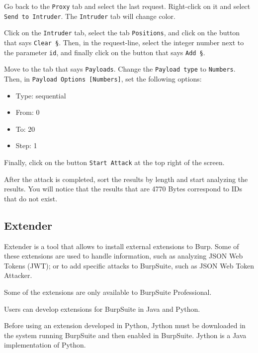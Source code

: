 \documentclass[twocolumn]{article}
\begin{document}
Go back to the \texttt{Proxy} tab and select the last request. Right-click on it and select \texttt{Send to Intruder}. The \texttt{Intruder} tab will change color.

Click on the \texttt{Intruder} tab, select the tab \texttt{Positions}, and click on the button that says \texttt{Clear \S}. Then, in the request-line, select the integer number next to the parameter \texttt{id}, and finally click on the button that says \texttt{Add \S}.

Move to the tab that says \texttt{Payloads}. Change the \texttt{Payload type} to \texttt{Numbers}. Then, in \texttt{Payload Options [Numbers]}, set the following options:

\begin{itemize}
    \item Type: sequential
    \item From: 0
    \item To: 20
    \item Step: 1
\end{itemize}

Finally, click on the button \texttt{Start Attack} at the top right of the screen.

After the attack is completed, sort the results by length and start analyzing the results. You will notice that the results that are 4770 Bytes correspond to IDs that do not exist.

\subsection{Extender}

Extender is a tool that allows to install external extensions to Burp. Some of these extensions are used to handle information, such as analyzing JSON Web Tokens (JWT); or to add specific attacks to BurpSuite, such as JSON Web Token Attacker.

Some of the extensions are only available to BurpSuite Professional.

Users can develop extensions for BurpSuite in Java and Python.

Before using an extension developed in Python, Jython\cite{jython} must be downloaded in the system running BurpSuite and then enabled in BurpSuite. Jython is a Java implementation of Python.
\end{document}
